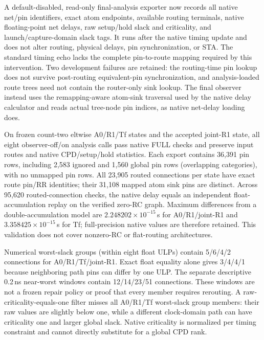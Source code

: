 A default-disabled, read-only final-analysis exporter now records all native net/pin identifiers, exact atom endpoints, available routing terminals, native floating-point net delays, raw setup/hold slack and criticality, and launch/capture-domain slack tags. It runs after the native timing update and does not alter routing, physical delays, pin synchronization, or STA. The standard timing echo lacks the complete pin-to-route mapping required by this intervention. Two development failures are retained: the routing-time pin lookup does not survive post-routing equivalent-pin synchronization, and analysis-loaded route trees need not contain the router-only sink lookup. The final observer instead uses the remapping-aware atom-sink traversal used by the native delay calculator and reads actual tree-node pin indices, as native net-delay loading does.

On frozen count-two eltwise A0/R1/Tf states and the accepted joint-R1 state, all eight observer-off/on analysis calls pass native FULL checks and preserve input routes and native CPD/setup/hold statistics. Each export contains 36,391 pin rows, including 2,583 ignored and 1,560 global pin rows (overlapping categories), with no unmapped pin rows. All 23,905 routed connections per state have exact route pin/RR identities; their 31,108 mapped atom sink pins are distinct. Across 95,620 routed-connection checks, the native delay equals an independent float-accumulation replay on the verified zero-RC graph. Maximum differences from a double-accumulation model are $2.248202\times10^{-15}$\,s for A0/R1/joint-R1 and $3.358425\times10^{-15}$\,s for Tf; full-precision native values are therefore retained. This validation does not cover nonzero-RC or flat-routing architectures.

Numerical worst-slack groups (within eight float ULPs) contain 5/6/4/2 connections for A0/R1/Tf/joint-R1. Exact float equality alone gives 3/4/4/1 because neighboring path pins can differ by one ULP. The separate descriptive 0.2\,ns near-worst windows contain 12/14/23/51 connections. These windows are not a frozen repair policy or proof that every member requires rerouting. A raw-criticality-equals-one filter misses all A0/R1/Tf worst-slack group members: their raw values are slightly below one, while a different clock-domain path can have criticality one and larger global slack. Native criticality is normalized per timing constraint and cannot directly substitute for a global CPD rank.

